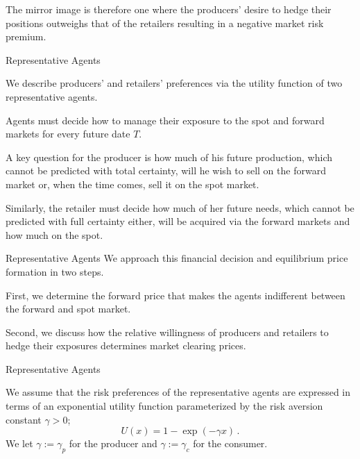 	The mirror image is therefore one
where the producers' desire to hedge their positions outweighs that
of the retailers resulting in a negative market risk premium.






{Representative Agents}







	We describe producers' and retailers'
preferences via the utility function of two representative agents.


	Agents
must decide how to manage their exposure to the spot and forward
markets for every future date $T$.


	
A key question for the producer
is how much of his future production, which cannot be predicted with
total certainty, will he wish to sell on the forward market or, when
the time comes, sell it on the spot market.


	Similarly, the retailer
must decide how much of her future needs, which cannot be predicted
with full certainty either, will be acquired via the forward markets
and how much on the spot.





{Representative Agents}
We approach this financial decision and
equilibrium price formation in two steps.







	First, we determine the
forward price that makes the agents indifferent between the forward
and spot market.


	Second, we discuss how the relative willingness
of producers and retailers to hedge their exposures determines
market clearing prices.





{Representative Agents}

We assume that the risk preferences of the representative agents are
expressed in terms of an exponential utility function parameterized
by the risk aversion constant $\gamma>0$;
$$
U(x)=1-\exp(-\gamma x)\,.
$$
We let $\gamma:=\gamma_p$ for the producer and $\gamma:=\gamma_c$
for the consumer.

